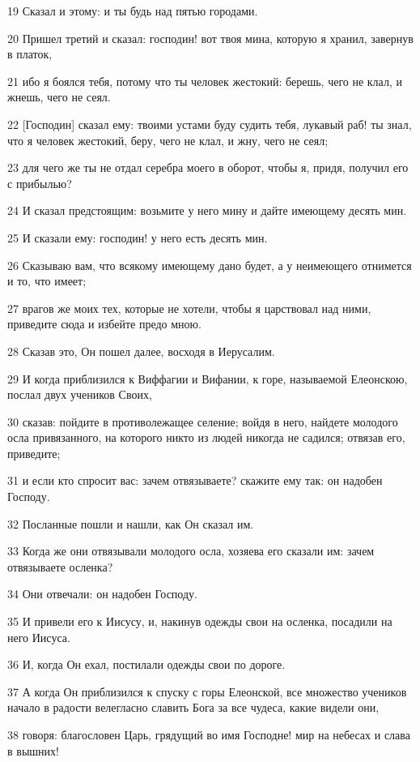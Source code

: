 \par 19 Сказал и этому: и ты будь над пятью городами.
\par 20 Пришел третий и сказал: господин! вот твоя мина, которую я хранил, завернув в платок,
\par 21 ибо я боялся тебя, потому что ты человек жестокий: берешь, чего не клал, и жнешь, чего не сеял.
\par 22 [Господин] сказал ему: твоими устами буду судить тебя, лукавый раб! ты знал, что я человек жестокий, беру, чего не клал, и жну, чего не сеял;
\par 23 для чего же ты не отдал серебра моего в оборот, чтобы я, придя, получил его с прибылью?
\par 24 И сказал предстоящим: возьмите у него мину и дайте имеющему десять мин.
\par 25 И сказали ему: господин! у него есть десять мин.
\par 26 Сказываю вам, что всякому имеющему дано будет, а у неимеющего отнимется и то, что имеет;
\par 27 врагов же моих тех, которые не хотели, чтобы я царствовал над ними, приведите сюда и избейте предо мною.
\par 28 Сказав это, Он пошел далее, восходя в Иерусалим.
\par 29 И когда приблизился к Виффагии и Вифании, к горе, называемой Елеонскою, послал двух учеников Своих,
\par 30 сказав: пойдите в противолежащее селение; войдя в него, найдете молодого осла привязанного, на которого никто из людей никогда не садился; отвязав его, приведите;
\par 31 и если кто спросит вас: зачем отвязываете? скажите ему так: он надобен Господу.
\par 32 Посланные пошли и нашли, как Он сказал им.
\par 33 Когда же они отвязывали молодого осла, хозяева его сказали им: зачем отвязываете осленка?
\par 34 Они отвечали: он надобен Господу.
\par 35 И привели его к Иисусу, и, накинув одежды свои на осленка, посадили на него Иисуса.
\par 36 И, когда Он ехал, постилали одежды свои по дороге.
\par 37 А когда Он приблизился к спуску с горы Елеонской, все множество учеников начало в радости велегласно славить Бога за все чудеса, какие видели они,
\par 38 говоря: благословен Царь, грядущий во имя Господне! мир на небесах и слава в вышних!
